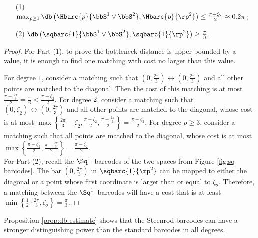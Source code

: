 \begin{proposition}\label{prop:db estimate}
	\begin{itemize}
		\item [(1)] $\max_{p\geq 1}\db\left(\Hbarc{p}{\bbS^1\vee\bbS^2}, \Hbarc{p}{\rp^2}\right)\leq \frac{\pi-\zeta_2}{2}\approx 0.2\pi$;
		\item [(2)] $\db\left(\sqbarc{1}{\bbS^1\vee \bbS^2}, \sqbarc{1}{\rp^2}\right)\geq \frac{\pi}{3}.$
	\end{itemize}
\end{proposition}

\begin{proof}
	For Part (1), to prove the bottleneck distance is upper bounded by a value, it is enough to find one matching with cost no larger than this value.

	For degree $1$, consider a matching such that $(0,\frac{2\pi}{3})\leftrightarrow (0,\frac{2\pi}{3})$ and all other points are matched to the diagonal. Then the cost of this matching is at most $\frac{\pi-\frac{2\pi}{3}}{2}=\frac{\pi}{6}< \frac{\pi-\zeta_2}{2}.$
	For degree $2$, consider a matching such that $(0,\zeta_2)\leftrightarrow (0,\frac{2\pi}{3})$ and all other points are matched to the diagonal, whose cost is at most $\max\left\{ \frac{2\pi}{3}-\zeta_2, \frac{\pi-\zeta_2}{2}, \frac{\pi-\frac{2\pi}{3}}{2}\right\} = \frac{\pi-\zeta_2}{2}.$
	For degree $p\geq 3$, consider a matching such that all points are matched to the diagonal, whose cost is at most $\max\left\{ \frac{\pi-\zeta_2}{2}, \frac{\pi-\frac{2\pi}{3}}{2}\right\} = \frac{\pi-\zeta_2}{2}.$
	\\

	For Part (2), recall the $\Sq^1$--barcodes of the two spaces from Figure \ref{fig:sq barcodes}. The bar $(0,\frac{2\pi}{3})$ in $\sqbarc{1}{\rp^2}$ can be mapped to either the diagonal or a point whose first coordinate is larger than or equal to $\zeta_2$. Therefore, a matching between the $\Sq^1$--barcodes will have a cost that is at least $\min\left\{\frac{1}{2}\cdot\frac{2\pi}{3}, \zeta_2\right\} = \frac{\pi}{3}.$
\end{proof}

Proposition \ref{prop:db estimate} shows that the Steenrod barcodes can have a stronger distinguishing power than the standard barcodes in all degrees.
